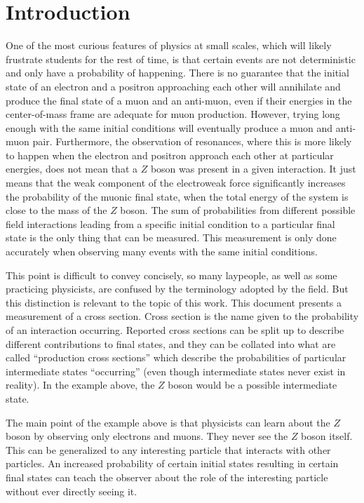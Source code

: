 \chapter{Introduction} \label{ch:intro}

One of the most curious features of physics at small scales,
which will likely frustrate students for the rest of time,
is that certain events are not deterministic and only have a probability of happening.
There is no guarantee that the initial state of an electron and a positron approaching
each other will annihilate and produce the final state of a muon and an anti-muon,
even if their energies in the center-of-mass frame are adequate for muon production.
However, trying long enough with the same initial conditions will eventually
produce a muon and anti-muon pair.
Furthermore, the observation of resonances, where this is more likely to happen
when the electron and positron approach each other at particular energies,
does not mean that a $Z$ boson was present in a given interaction.
It just means that the weak component of the electroweak force significantly increases
the probability of the muonic final state,
when the total energy of the system is close to the mass of the $Z$ boson.
The sum of probabilities from different possible field interactions leading from a specific
initial condition to a particular final state is the only thing that can be measured.
This measurement is only done accurately
when observing many events with the same initial conditions.

This point is difficult to convey concisely, so many laypeople,
as well as some practicing physicists, are confused by the terminology adopted by the field.
But this distinction is relevant to the topic of this work.
This document presents a measurement of a cross section.
Cross section is the name given to the probability of an interaction occurring.
Reported cross sections can be split up to describe different contributions to final states,
and they can be collated into what are called ``production cross sections'' which describe
the probabilities of particular intermediate states ``occurring''
(even though intermediate states never exist in reality).
In the example above, the $Z$ boson would be a possible intermediate state.

The main point of the example above is that physicists can learn about the $Z$ boson
by observing only electrons and muons.
They never see the $Z$ boson itself.
This can be generalized to any interesting particle that interacts with other particles.
An increased probability of certain initial states resulting in certain final states
can teach the observer about the role of the interesting particle
without ever directly seeing it.

